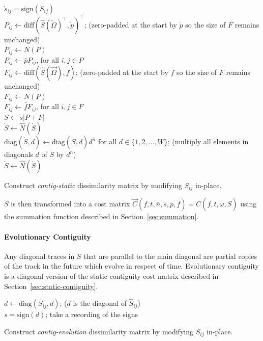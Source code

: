 \documentclass[twocolumn]{article}
\begin{document}
\begin{algorithm}
	\DontPrintSemicolon %
	$\dot s_{ij} = \mathrm{sign}(S_{ij})$ \\
	$P_{ij} \gets \mathrm{diff}( \hat S( \overleftarrow{\Omega} )^\intercal, \dot p )^\intercal$; (zero-padded at the start by $\dot p$ so the size of $F$ remains unchanged) \\
	$P_{ij} \gets N( P )$ \\
	$ P_{ij} \gets  \bar p P_{ij}$, for all $i,j \in P$ \\

	$F_{ij} \gets \mathrm{diff}( \hat S( \overrightarrow{\Omega} ), \dot f )$; (zero-padded at the start by $\dot f$ so the size of $F$ remains unchanged) \\
	$F_{ij} \gets N( P )$ \\
	$ F_{ij} \gets  \bar f F_{ij}$, for all $i,j \in F$ \\
	$\dot S \gets \dot s|P+F|$ \\
	$\dot S \gets \hat N(\dot S)$ \\
	
	$\mathrm{diag}( \dot S, d ) \gets \mathrm{diag}( \dot S, d ) d^{\bar n}$ for all $d \in \{1,2,\ldots,W\}$; (multiply all elements in diagonals $d$ of $\dot S$ by $d^{\bar n}$) \\
	$\dot S \gets \hat N(\dot S)$ \\

	\;
	\caption{Construct \textit{contig-static} dissimilarity matrix by modifying $S_{ij}$ in-place.}
	\label{algo:contig}
\end{algorithm}
	
	
$\dot S$ is then transformed into a cost matrix $\vec{C}(f,t,\bar n,\dot s,\dot p,\dot f) = C(f,t, \omega, \dot S)$ using the summation function described in Section~\ref{sec:summation}.

	
\paragraph{Evolutionary Contiguity}

Any diagonal traces in $S$ that are parallel to the main diagonal are partial copies of the track in the future which evolve in respect of time. Evolutionary contiguity is a diagonal version of the static contiguity cost matrix described in Section~\ref{sec:static-contiguity}.


\begin{algorithm}
	\DontPrintSemicolon %

	
	 {
	
	$d \gets \mathrm{diag}( S_{ij}, d )$; ($d$ is the diagonal of $\hat S_{ij}$)\\
	$s = \mathrm{sign}(d)$; take a recording of the signs 
	
	
	}
	
	\;
	\caption{Construct \textit{contig-evolution} dissimilarity matrix by modifying $S_{ij}$ in-place.}
	\label{algo:contig}
\end{algorithm}
\end{document}
